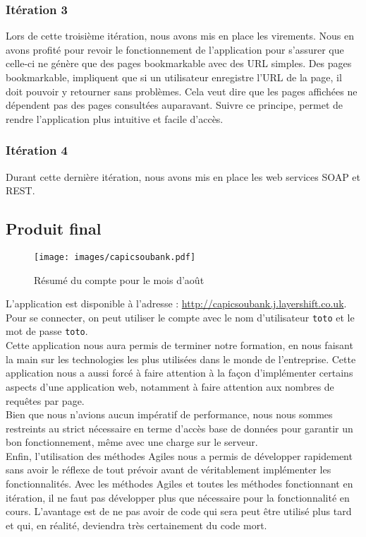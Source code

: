\subsubsection{Itération 3}

Lors de cette troisième itération, nous avons mis en place les virements. Nous en avons profité pour revoir le fonctionnement de l'application pour s'assurer que celle-ci ne génère que des pages \flqq{}bookmarkable\frqq{} avec des URL simples. Des pages bookmarkable, impliquent que si un utilisateur enregistre l'URL de la page, il doit pouvoir y retourner sans problèmes. Cela veut dire que les pages affichées ne dépendent pas des pages consultées auparavant. Suivre ce principe, permet de rendre l'application plus intuitive et facile d'accès.

\subsubsection{Itération 4}

Durant cette dernière itération, nous avons mis en place les web services SOAP et REST.

\subsection{Produit final}

\begin{figure}[H]
	\centering
	\texttt{[image: images/capicsoubank.pdf]}
	\caption{Résumé du compte pour le mois d'août}
\end{figure}

L'application est disponible à l'adresse : \url{http://capicsoubank.j.layershift.co.uk}. Pour se connecter, on peut utiliser le compte avec le nom d'utilisateur \verb+toto+ et le mot de passe \verb+toto+.\\

Cette application nous aura permis de terminer notre formation, en nous faisant la main sur les technologies les plus utilisées dans le monde de l'entreprise. Cette application nous a aussi forcé à faire attention à la façon d'implémenter certains aspects d'une application web, notamment à faire attention aux nombres de requêtes par page.\\

Bien que nous n'avions aucun impératif de performance, nous nous sommes restreints au strict nécessaire en terme d'accès base de données pour garantir un bon fonctionnement, même avec une charge sur le serveur.\\

Enfin, l'utilisation des méthodes Agiles nous a permis de développer rapidement sans avoir le réflexe de tout prévoir avant de véritablement implémenter les fonctionnalités. Avec les méthodes Agiles et toutes les méthodes fonctionnant en itération, il ne faut pas développer plus que nécessaire pour la fonctionnalité en cours. L'avantage est de ne pas avoir de code qui sera peut être utilisé plus tard et qui, en réalité, deviendra très certainement du code mort.
